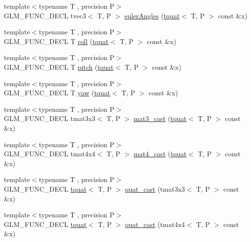 \begin{DoxyCompactItemize}
\item 
{\footnotesize template$<$typename T , precision P$>$ }\\G\+L\+M\+\_\+\+F\+U\+N\+C\+\_\+\+D\+E\+C\+L tvec3$<$ T, P $>$ \hyperlink{group__gtc__quaternion_gadb92ec1c1b0dd6b024176a73fbef3e64}{euler\+Angles} (\hyperlink{structglm_1_1tquat}{tquat}$<$ T, P $>$ const \&x)
\item 
{\footnotesize template$<$typename T , precision P$>$ }\\G\+L\+M\+\_\+\+F\+U\+N\+C\+\_\+\+D\+E\+C\+L T \hyperlink{group__gtc__quaternion_ga4fd705376c6c1fd667be0055a0ea58ec}{roll} (\hyperlink{structglm_1_1tquat}{tquat}$<$ T, P $>$ const \&x)
\item 
{\footnotesize template$<$typename T , precision P$>$ }\\G\+L\+M\+\_\+\+F\+U\+N\+C\+\_\+\+D\+E\+C\+L T \hyperlink{group__gtc__quaternion_ga2c08b93a4261c10748fd4d2104346f17}{pitch} (\hyperlink{structglm_1_1tquat}{tquat}$<$ T, P $>$ const \&x)
\item 
{\footnotesize template$<$typename T , precision P$>$ }\\G\+L\+M\+\_\+\+F\+U\+N\+C\+\_\+\+D\+E\+C\+L T \hyperlink{group__gtc__quaternion_ga724a5df282b70cec0a6cb0d6dcddb6d6}{yaw} (\hyperlink{structglm_1_1tquat}{tquat}$<$ T, P $>$ const \&x)
\item 
{\footnotesize template$<$typename T , precision P$>$ }\\G\+L\+M\+\_\+\+F\+U\+N\+C\+\_\+\+D\+E\+C\+L tmat3x3$<$ T, P $>$ \hyperlink{group__gtc__quaternion_gae04c39422eb4e450ec8c4f45a1057b40}{mat3\+\_\+cast} (\hyperlink{structglm_1_1tquat}{tquat}$<$ T, P $>$ const \&x)
\item 
{\footnotesize template$<$typename T , precision P$>$ }\\G\+L\+M\+\_\+\+F\+U\+N\+C\+\_\+\+D\+E\+C\+L tmat4x4$<$ T, P $>$ \hyperlink{group__gtc__quaternion_ga14bb2ddf028c91542763eb6f2bba47ef}{mat4\+\_\+cast} (\hyperlink{structglm_1_1tquat}{tquat}$<$ T, P $>$ const \&x)
\item 
{\footnotesize template$<$typename T , precision P$>$ }\\G\+L\+M\+\_\+\+F\+U\+N\+C\+\_\+\+D\+E\+C\+L \hyperlink{structglm_1_1tquat}{tquat}$<$ T, P $>$ \hyperlink{group__gtc__quaternion_ga950f8acff3e33bbda77895a3dcb7e5ce}{quat\+\_\+cast} (tmat3x3$<$ T, P $>$ const \&x)
\item 
{\footnotesize template$<$typename T , precision P$>$ }\\G\+L\+M\+\_\+\+F\+U\+N\+C\+\_\+\+D\+E\+C\+L \hyperlink{structglm_1_1tquat}{tquat}$<$ T, P $>$ \hyperlink{group__gtc__quaternion_ga3e4615e9884dd0f41f5617b9848a5d9c}{quat\+\_\+cast} (tmat4x4$<$ T, P $>$ const \&x)

\end{DoxyCompactItemize}

